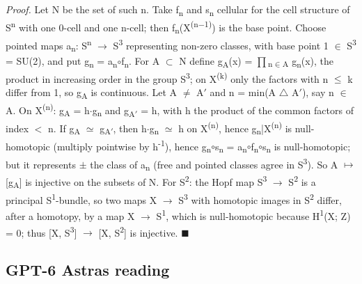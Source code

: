 \emph{Proof.} Let N be the set of such n. Take f\textsubscript{n} and s\textsubscript{n} cellular for the cell structure of S\textsuperscript{n} with one 0-cell and one n-cell; then f\textsubscript{n}(X\textsuperscript{(n\ensuremath{-}1)}) is the base point. Choose pointed maps a\textsubscript{n}: S\textsuperscript{n} \ensuremath{\to} S\textsuperscript{3} representing non-zero classes, with base point 1 \ensuremath{\in} S\textsuperscript{3} = SU(2), and put g\textsubscript{n} = a\textsubscript{n}\ensuremath{\circ}f\textsubscript{n}. For A \ensuremath{\subset} N define g\textsubscript{A}(x) = \ensuremath{\prod}\textsubscript{n\ensuremath{\in}A} g\textsubscript{n}(x), the product in increasing order in the group S\textsuperscript{3}; on X\textsuperscript{(k)} only the factors with n \ensuremath{\leq} k differ from 1, so g\textsubscript{A} is continuous. Let A \ensuremath{\ne} A\ensuremath{\prime} and n = min(A \ensuremath{\triangle} A\ensuremath{\prime}), say n \ensuremath{\in} A. On X\textsuperscript{(n)}: g\textsubscript{A} = h\ensuremath{\cdot}g\textsubscript{n} and g\textsubscript{A\ensuremath{\prime}} = h, with h the product of the common factors of index \ensuremath{<} n. If g\textsubscript{A} \ensuremath{\simeq} g\textsubscript{A\ensuremath{\prime}}, then h\ensuremath{\cdot}g\textsubscript{n} \ensuremath{\simeq} h on X\textsuperscript{(n)}, hence g\textsubscript{n}|X\textsuperscript{(n)} is null-homotopic (multiply pointwise by h\textsuperscript{-1}), hence g\textsubscript{n}\ensuremath{\circ}s\textsubscript{n} = a\textsubscript{n}\ensuremath{\circ}f\textsubscript{n}\ensuremath{\circ}s\textsubscript{n} is null-homotopic; but it represents \ensuremath{\pm} the class of a\textsubscript{n} (free and pointed classes agree in S\textsuperscript{3}). So A \ensuremath{\mapsto} [g\textsubscript{A}] is injective on the subsets of N. For S\textsuperscript{2}: the Hopf map S\textsuperscript{3} \ensuremath{\to} S\textsuperscript{2} is a principal S\textsuperscript{1}-bundle, so two maps X \ensuremath{\to} S\textsuperscript{3} with homotopic images in S\textsuperscript{2} differ, after a homotopy, by a map X \ensuremath{\to} S\textsuperscript{1}, which is null-homotopic because H\textsuperscript{1}(X; Z) = 0; thus [X, S\textsuperscript{3}] \ensuremath{\to} [X, S\textsuperscript{2}] is injective. \ensuremath{\blacksquare}


\subsection*{GPT-6 Astra\textquotesingle s reading}

